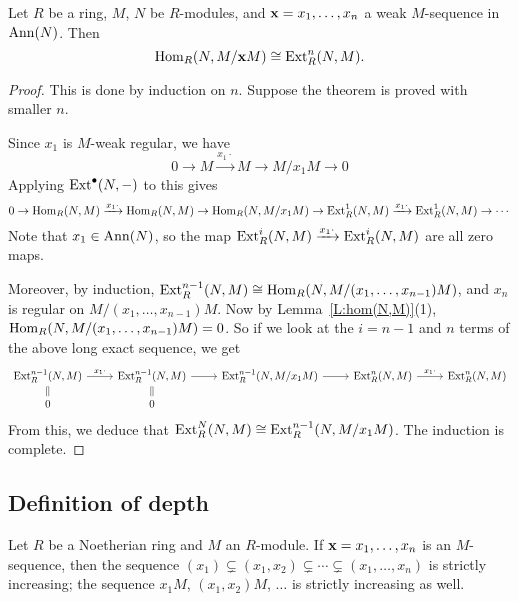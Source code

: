 	\begin{lemma}
		\label{L:cohomology shifting technique}
		Let $R$ be a ring, $M$, $N$ be $R$-modules, and $\mathbf{x} = x_1, \dots, x_n$ a weak $M$-sequence in $\operatorname{Ann}(N)$. Then
		\[
		\operatorname{Hom}_R(N, M/\mathbf{x} M) \cong \operatorname{Ext}^n_R(N, M).
		\]
	\end{lemma}
	\begin{proof}
		This is done by induction on $n$. Suppose the theorem is proved with smaller $n$.
		
		Since $x_1$ is $M$-weak regular, we have
		$$
		0 \to M \xrightarrow{x_1 \cdot }M \to M/ x_1M \to 0
		$$
		Applying $\operatorname{Ext}^\bullet(N,-)$ to this gives
		$$
		0 \to \operatorname{Hom}_R(N, M) \xrightarrow{x_1\cdot }\operatorname{Hom}_R(N,M) \to \operatorname{Hom}_R(N, M/x_1M) \to \operatorname{Ext}^1_R(N, M) \xrightarrow{x_1 \cdot} \operatorname{Ext}^1_R(N, M) \to \cdots
		$$
		Note that $x_1\in \operatorname{Ann}(N)$, so the map $\operatorname{Ext}^i_R(N, M) \xrightarrow{x_1 \cdot} \operatorname{Ext}^i_R(N, M)$ are all zero maps. 
		
		Moreover, by induction, $\operatorname{Ext}_R^{n-1}(N, M) \cong \operatorname{Hom}_R(N, M/(x_1, \dots, x_{n-1})M)$, and $x_n$ is regular on $M/(x_1, \dots, x_{n-1})M$. Now by Lemma~\ref{L:hom(N,M)}(1), $\operatorname{Hom}_R(N, M/(x_1, \dots, x_{n-1})M) = 0$. So if we look at the $i=n-1$ and $n$ terms of the above long exact sequence, we get
		$$
		\begin{tikzcd}[row sep = small]
			\Ext_R^{n-1}(N, M) \ar[d, equal] \ar[r, "x_1\cdot"]&
			\Ext_R^{n-1}(N, M) \ar[d, equal] \ar[r]&
			\Ext_R^{n-1}(N, M/x_1M)  \ar[r] &
			\Ext_R^n(N, M) \ar[r, "x_1\cdot "]
			&\Ext_R^n(N, M)
			\\ 0 & 0
		\end{tikzcd}
		$$
		From this, we deduce that $\operatorname{Ext}^N_R(N, M) \cong \operatorname{Ext}^{n-1}_R(N, M/x_1M)$. The induction is complete.
	\end{proof}
	
	
	\subsection{Definition of depth}
	\begin{lemma}
		Let $R$ be a Noetherian ring and $M$ an $R$-module. If $\mathbf{x} = x_1, \dots, x_n$ is an $M$-sequence, then the sequence $(x_1) \subsetneq (x_1, x_2) \subsetneq \cdots \subsetneq (x_1, \dots, x_n)$ is strictly increasing; the sequence $x_1M$, $(x_1, x_2)M$, $\dots$ is strictly increasing as well.
	\end{lemma}
	
